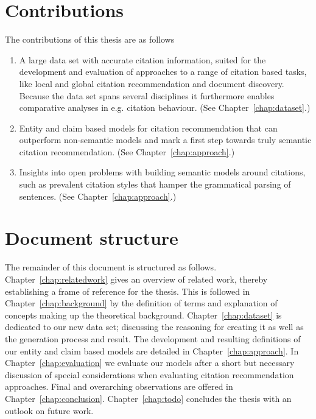 \section{Contributions}\label{sec:contributions}
The contributions of this thesis are as follows
\begin{enumerate}
\item A large data set with accurate citation information, suited for the development and evaluation of approaches to a range of citation based tasks, like local and global citation recommendation and document discovery. Because the data set spans several disciplines it furthermore enables comparative analyses in e.g. citation behaviour. (See Chapter~\ref{chap:dataset}.)
\item Entity and claim based models for citation recommendation that can outperform non-semantic models and mark a first step towards truly semantic citation recommendation. (See Chapter~\ref{chap:approach}.)
\item Insights into open problems with building semantic models around citations, such as prevalent citation styles that hamper the grammatical parsing of sentences. (See Chapter~\ref{chap:approach}.)
\end{enumerate}

\section{Document structure}\label{sec:documentstructure}
The remainder of this document is structured as follows. Chapter~\ref{chap:relatedwork} gives an overview of related work, thereby establishing a frame of reference for the thesis. This is followed in Chapter~\ref{chap:background} by the definition of terms and explanation of concepts making up the theoretical background. Chapter~\ref{chap:dataset} is dedicated to our new data set; discussing the reasoning for creating it as well as the generation process and result. The development and resulting definitions of our entity and claim based models are detailed in Chapter~\ref{chap:approach}. In Chapter~\ref{chap:evaluation} we evaluate our models after a short but necessary discussion of special considerations when evaluating citation recommendation approaches. Final and overarching observations are offered in Chapter~\ref{chap:conclusion}. Chapter~\ref{chap:todo} concludes the thesis with an outlook on future work.
